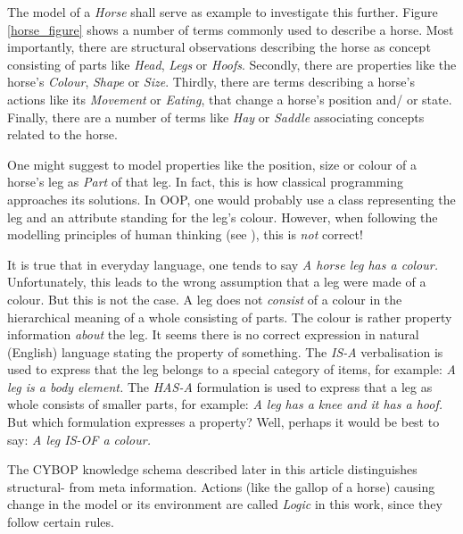 The model of a \emph{Horse} shall serve as example to investigate this further.
Figure \ref{horse_figure} shows a number of terms commonly used to describe a
horse. Most importantly, there are structural observations describing the horse
as concept consisting of parts like \emph{Head}, \emph{Legs} or \emph{Hoofs}.
Secondly, there are properties like the horse's \emph{Colour}, \emph{Shape} or
\emph{Size}. Thirdly, there are terms describing a horse's actions like its
\emph{Movement} or \emph{Eating}, that change a horse's position and/ or state.
Finally, there are a number of terms like \emph{Hay} or \emph{Saddle}
associating concepts related to the horse.

One might suggest to model properties like the position, size or colour of a
horse's leg as \emph{Part} of that leg. In fact, this is how classical
programming approaches its solutions. In OOP, one would probably use a class
representing the leg and an attribute standing for the leg's colour. However,
when following the modelling principles of human thinking (see
\cite{heller2004}), this is \emph{not} correct!

It is true that in everyday language, one tends to say \textit{A horse leg
\emph{has a} colour.} Unfortunately, this leads to the wrong assumption that a
leg were made of a colour. But this is not the case. A leg does not
\emph{consist} of a colour in the hierarchical meaning of a whole consisting of
parts. The colour is rather property information \emph{about} the leg. It seems
there is no correct expression in natural (English) language stating the
property of something. The \emph{IS-A} verbalisation is used to express that
the leg belongs to a special category of items, for example: \textit{A leg is a
body element.} The \emph{HAS-A} formulation is used to express that a leg as
whole consists of smaller parts, for example: \textit{A leg has a knee and it
has a hoof.} But which formulation expresses a property? Well, perhaps it would
be best to say: \textit{A leg IS-OF a colour.}

The CYBOP knowledge schema described later in this article distinguishes
structural- from meta information. Actions (like the gallop of a horse) causing
change in the model or its environment are called \emph{Logic} in this work,
since they follow certain rules.
